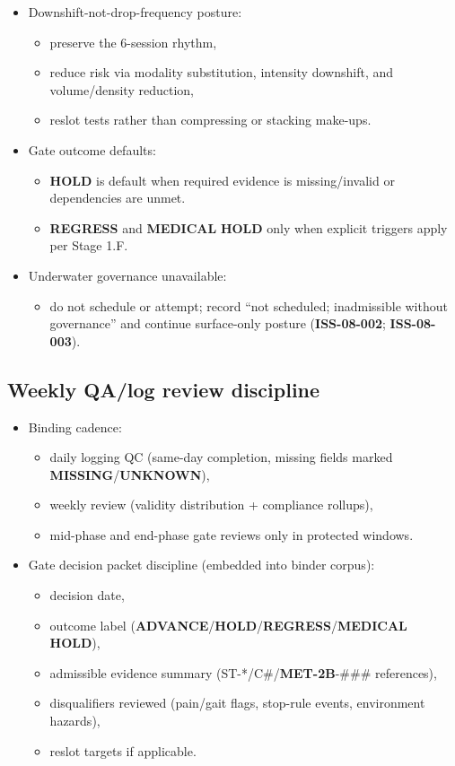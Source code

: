 \documentclass[10pt]{article}
\begin{document}
\begin{itemize}
\item Downshift-not-drop-frequency posture:
  \begin{itemize}
  \item preserve the 6-session rhythm,
  \item reduce risk via modality substitution, intensity downshift, and volume/density reduction,
  \item reslot tests rather than compressing or stacking make-ups.
  \end{itemize}
\item Gate outcome defaults:
  \begin{itemize}
  \item \textbf{HOLD} is default when required evidence is missing/invalid or dependencies are unmet.
  \item \textbf{REGRESS} and \textbf{MEDICAL} \textbf{HOLD} only when explicit triggers apply per Stage 1.F.
  \end{itemize}
\item Underwater governance unavailable:
  \begin{itemize}
  \item do not schedule or attempt; record “not scheduled; inadmissible without governance” and continue surface-only posture (\textbf{ISS-08-002}; \textbf{ISS-08-003}).
  \end{itemize}
\end{itemize}

\subsection*{Weekly QA/log review discipline}
{}

\begin{itemize}
\item Binding cadence:
  \begin{itemize}
  \item daily logging QC (same-day completion, missing fields marked \textbf{MISSING}/\textbf{UNKNOWN}),
  \item weekly review (validity distribution + compliance rollups),
  \item mid-phase and end-phase gate reviews only in protected windows.
  \end{itemize}
\item Gate decision packet discipline (embedded into binder corpus):
  \begin{itemize}
  \item decision date,
  \item outcome label (\textbf{ADVANCE}/\textbf{HOLD}/\textbf{REGRESS}/\textbf{MEDICAL} \textbf{HOLD}),
  \item admissible evidence summary (ST-*/C\#/\textbf{MET-2B}-\#\#\# references),
  \item disqualifiers reviewed (pain/gait flags, stop-rule events, environment hazards),
  \item reslot targets if applicable.
  \end{itemize}
\end{itemize}
\end{document}
